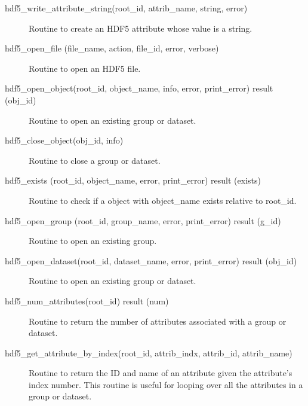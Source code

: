 \begin{description}

\label{r:hdf5.write.attribute.string}
\item[hdf5_write_attribute_string(root_id, attrib_name, string, error)] \Newline 
Routine to create an HDF5 attribute whose value is a string.

\label{r:hdf5.open.file}
\item[hdf5_open_file (file_name, action, file_id, error, verbose)] \Newline 
Routine to open an HDF5 file.

\label{r:hdf5.open.object}
\item[hdf5_open_object(root_id, object_name, info, error, print_error) result (obj_id)] \Newline 
Routine to open an existing group or dataset.

\label{r:hdf5.close.object}
\item[hdf5_close_object(obj_id, info)] \Newline 
Routine to close a group or dataset.

\label{r:hdf5.exists}
\item[hdf5_exists (root_id, object_name, error, print_error) result (exists)] \Newline 
Routine to check if a object with object_name exists relative to root_id.

\label{r:hdf5.open.group}
\item[hdf5_open_group (root_id, group_name, error, print_error) result (g_id)] \Newline 
Routine to open an existing group.

\label{r:hdf5.open.dataset}
\item[hdf5_open_dataset(root_id, dataset_name, error, print_error) result (obj_id)] \Newline 
Routine to open an existing group or dataset.

\label{r:hdf5.num.attributes}
\item[hdf5_num_attributes(root_id) result (num)] \Newline 
Routine to return the number of attributes associated with a group or dataset.

\label{r:hdf5.get.attribute.by.index}
\item[hdf5_get_attribute_by_index(root_id, attrib_indx, attrib_id, attrib_name)] \Newline 
Routine to return the ID and name of an attribute given the attribute's index number.
This routine is useful for looping over all the attributes in a group or dataset.


\end{description}
